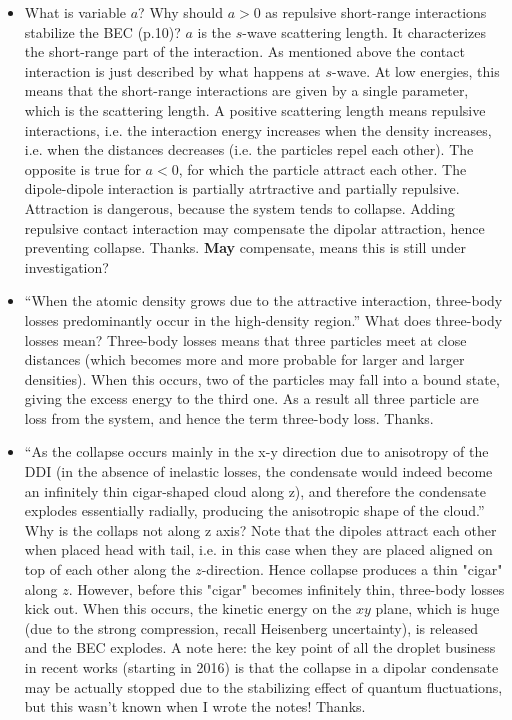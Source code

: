 \begin{itemize}
    \item What is variable $a$? Why should $a > 0$ as repulsive short-range interactions stabilize the BEC (p.10)?
    {\color{red}
        $a$ is the $s$-wave scattering length.
        It characterizes the short-range part of the interaction.
        As mentioned above the contact interaction is just described by what happens at $s$-wave.
        At low energies, this means that the short-range interactions are given by a single parameter,
        which is the scattering length. A positive scattering length means repulsive interactions,
        i.e. the interaction energy increases when the density increases, i.e. when the distances decreases
        (i.e. the particles repel each other).
        The opposite is true for $a<0$, for which the particle attract each other.
        The dipole-dipole interaction is partially atrtractive and partially repulsive. Attraction is dangerous,
        because the system tends to collapse.
        Adding repulsive contact interaction may compensate the dipolar attraction, hence preventing collapse.
    }
    {\color{green}
        Thanks. \textbf{May} compensate, means this is still under investigation?
    }

    \item ``When the atomic density grows due to the attractive interaction,
        three-body losses predominantly occur in the high-density region.'' What does three-body losses mean?
    {\color{red}
        Three-body losses means that three particles meet at close distances
        (which becomes more and more probable for larger and larger densities).
        When this occurs, two of the particles may
        fall into a bound state, giving the excess energy to the third one.
        As a result all three particle are loss from the system, and hence the term three-body loss.
    }
    {\color{green}
        Thanks.
    }

    \item ``As the collapse occurs mainly in the x-y direction due to anisotropy of the DDI
        (in the absence of inelastic losses,
        the condensate would indeed become an infinitely thin cigar-shaped cloud along z),
        and therefore the condensate explodes essentially radially, producing the anisotropic
        shape of the cloud.'' Why is the collaps not along z axis?
    {\color{red}
        Note that the dipoles attract each other when placed head with tail,
        i.e. in this case when they are placed aligned on top of each other along the $z$-direction.
        Hence collapse produces a thin "cigar" along $z$.
        However, before this "cigar" becomes infinitely thin, three-body losses kick out.
        When this occurs, the kinetic energy on the $xy$ plane, which is huge
        (due to the strong compression, recall Heisenberg uncertainty), is released and the BEC explodes.
        A note here: the key point of all the droplet business in recent works (starting in 2016)
        is that the collapse in a dipolar condensate may be actually stopped due to the stabilizing effect
        of quantum fluctuations, but this wasn't known when I wrote the notes!
    }
    {\color{green}
        Thanks.
    }


\end{itemize}
